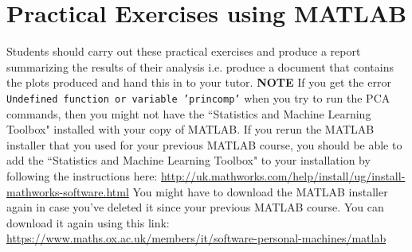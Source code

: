 \documentclass[answers]{exam}
\begin{document}
\section*{Practical Exercises using MATLAB}
Students should carry out these practical exercises and produce a report summarizing the results of their analysis i.e. produce a document that contains the plots produced and hand this in to your tutor. \textbf{NOTE} If you get the error \texttt{Undefined function or variable 'princomp'} when you try to run the PCA commands, then you might not have the ``Statistics and Machine Learning Toolbox" installed with your copy of MATLAB. If you rerun the MATLAB installer that you used for your previous MATLAB course, you should be able to add the ``Statistics and Machine Learning Toolbox" to your installation by following the instructions here: \url{http://uk.mathworks.com/help/install/ug/install-mathworks-software.html} You might have to download the MATLAB installer again in case you've deleted it since your previous MATLAB course. You can download it again using this link: \url{https://www.maths.ox.ac.uk/members/it/software-personal-machines/matlab}
\end{document}
